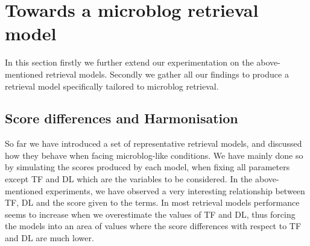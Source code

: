 


%
\section{Towards a microblog retrieval model}
In this section firstly we further extend our experimentation on the above-mentioned retrieval models. Secondly we gather all our findings to produce a retrieval model specifically tailored to microblog retrieval.

\subsection{Score differences and Harmonisation}
So far we have introduced a set of representative retrieval models, and discussed how they behave when facing microblog-like conditions. We have mainly done so by simulating the scores produced by each model, when fixing all parameters except TF and DL which are the variables to be considered. In the above-mentioned experiments, we have observed a very interesting relationship between TF, DL and the score given to the terms. In most retrieval models performance seems to increase when we overestimate the values of TF and DL, thus forcing the models into an area of values where the score differences with respect to TF and DL are much lower.


